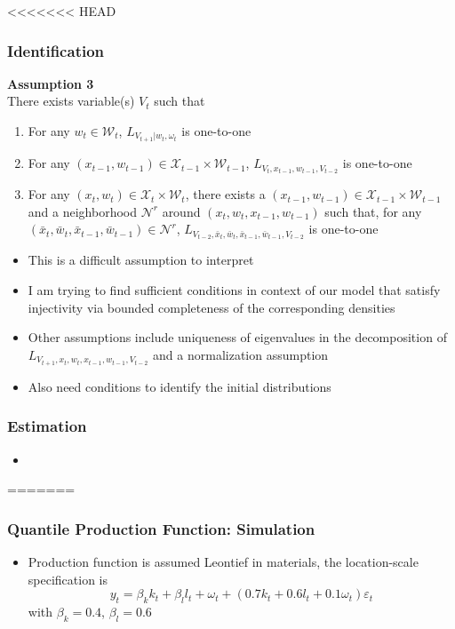 \documentclass{beamer}
\begin{document}
\begin{frame}
\begin{itemize}
\begin{frame}
\begin{itemize}
\begin{frame}
\begin{itemize}
\begin{frame}
\begin{itemize}
<<<<<<< HEAD
\begin{frame}
\frametitle{Identification}
\textbf{Assumption 3}\\
There exists variable(s) $V_{t}$ such that
    \begin{enumerate}
    \item For any $w_{t}\in \mathcal{W}_{t}$, $L_{V_{t+1}|w_{t}, \omega_{t}}$ is one-to-one
    \item For any $(x_{t-1}, w_{t-1})\in \mathcal{X}_{t-1}\times\mathcal{W}_{t-1}$, $L_{V_{t}, x_{t-1}, w_{t-1}, V_{t-2}}$ is one-to-one
    \item For any $(x_{t}, w_{t})\in \mathcal{X}_{t}\times\mathcal{W}_{t}$, there exists a $(x_{t-1}, w_{t-1})\in \mathcal{X}_{t-1}\times\mathcal{W}_{t-1}$ and a neighborhood $\mathcal{N}^{r}$ around $(x_{t}, w_{t}, x_{t-1}, w_{t-1})$ such that, for any $(\bar{x}_{t}, \bar{w}_{t}, \bar{x}_{t-1}, \bar{w}_{t-1})\in \mathcal{N}^{r}$, $L_{V_{t-2}, \bar{x}_{t}, \bar{w}_{t}, \bar{x}_{t-1}, \bar{w}_{t-1}, V_{t-2}}$ is one-to-one
    \end{enumerate}
\begin{itemize}
	\item This is a difficult assumption to interpret
	\item I am trying to find sufficient conditions in context of our model that satisfy injectivity via bounded completeness of the corresponding densities
	\item Other assumptions include uniqueness of eigenvalues in the decomposition of $L_{V_{t+1},x_{t},w_{t},x_{t-1}, w_{t-1}, V_{t-2}}$ and a normalization assumption
	\item Also need conditions to identify the initial distributions
\end{itemize}
\end{frame}

\begin{frame}
\frametitle{Estimation}
\begin{itemize}
\item 
\end{itemize}
\end{frame}

=======

\begin{frame}
\frametitle{Quantile Production Function: Simulation}
\begin{itemize}
	\item Production function is assumed Leontief in materials, the location-scale specification is
	\begin{equation}
		y_{t}=\beta_{k}k_{t}+\beta_{l}l_{t}+\omega_{t}+(0.7k_{t}+0.6l_{t}+0.1\omega_{t})\varepsilon_{t}
	\end{equation}
	with $\beta_{k}=0.4$, $\beta_{l}=0.6$\\
	

\end{itemize}
\end{frame}
\end{itemize}
\end{frame}
\end{itemize}
\end{frame}
\end{itemize}
\end{frame}
\end{itemize}
\end{frame}
\end{document}

